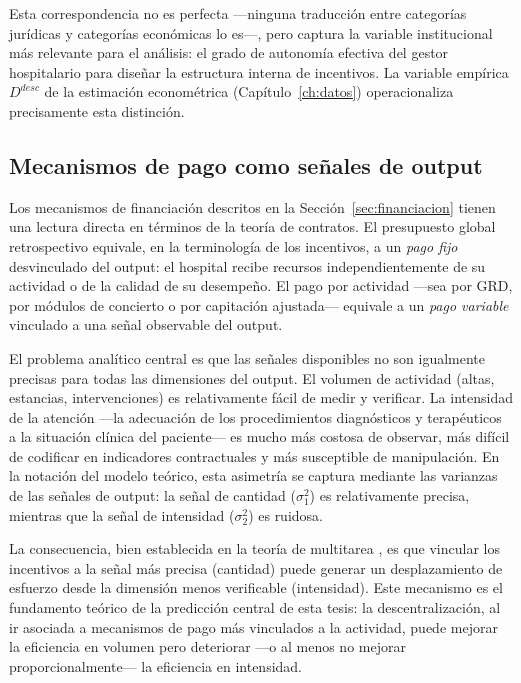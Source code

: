 Esta correspondencia no es perfecta ---ninguna traducción entre categorías jurídicas y categorías económicas lo es---, pero captura la variable institucional más relevante para el análisis: el grado de autonomía efectiva del gestor hospitalario para diseñar la estructura interna de incentivos. La variable empírica $D^{desc}$ de la estimación econométrica (Capítulo~\ref{ch:datos}) operacionaliza precisamente esta distinción.

\subsection{Mecanismos de pago como señales de output}

Los mecanismos de financiación descritos en la Sección~\ref{sec:financiacion} tienen una lectura directa en términos de la teoría de contratos. El presupuesto global retrospectivo equivale, en la terminología de los incentivos, a un \textit{pago fijo} desvinculado del output: el hospital recibe recursos independientemente de su actividad o de la calidad de su desempeño. El pago por actividad ---sea por GRD, por módulos de concierto o por capitación ajustada--- equivale a un \textit{pago variable} vinculado a una señal observable del output.

El problema analítico central es que las señales disponibles no son igualmente precisas para todas las dimensiones del output. El volumen de actividad (altas, estancias, intervenciones) es relativamente fácil de medir y verificar. La intensidad de la atención ---la adecuación de los procedimientos diagnósticos y terapéuticos a la situación clínica del paciente--- es mucho más costosa de observar, más difícil de codificar en indicadores contractuales y más susceptible de manipulación. En la notación del modelo teórico, esta asimetría se captura mediante las varianzas de las señales de output: la señal de cantidad ($\sigma_1^2$) es relativamente precisa, mientras que la señal de intensidad ($\sigma_2^2$) es ruidosa.

La consecuencia, bien establecida en la teoría de multitarea \citep{holmstrom1991}, es que vincular los incentivos a la señal más precisa (cantidad) puede generar un desplazamiento de esfuerzo desde la dimensión menos verificable (intensidad). Este mecanismo es el fundamento teórico de la predicción central de esta tesis: la descentralización, al ir asociada a mecanismos de pago más vinculados a la actividad, puede mejorar la eficiencia en volumen pero deteriorar ---o al menos no mejorar proporcionalmente--- la eficiencia en intensidad.

